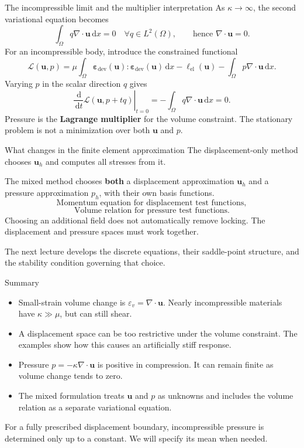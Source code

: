 \documentclass[11pt,aspectratio=169]{beamer}
\newcommand{\bu}{\bm u}
\newcommand{\beps}{\bm\varepsilon}
\newcommand{\Om}{\Omega}
\newcommand{\dd}{\,\mathrm d}
\newcommand{\divg}{\nabla\!\cdot}
\begin{document}
\begin{frame}{The incompressible limit and the multiplier interpretation}
As $\kappa\to\infty$, the second variational equation becomes
\[
\int_\Om q\divg\bu\dd x=0\quad\forall q\in L^2(\Om),
\qquad\text{hence }\divg\bu=0.
\]
For an incompressible body, introduce the constrained functional
\[
\mathcal L(\bu,p)=\mu\int_\Om\beps_{\mathrm{dev}}(\bu):
\beps_{\mathrm{dev}}(\bu)\dd x-\ell_{\mathrm{el}}(\bu)
-\int_\Om p\divg\bu\dd x.
\]
Varying $p$ in the scalar direction $q$ gives
\[
\left.\frac{\dd}{\dd t}\mathcal L(\bu,p+tq)\right|_{t=0}
=-\int_\Om q\divg\bu\dd x=0.
\]
Pressure is the \textbf{Lagrange multiplier} for the volume constraint.
The stationary problem is not a minimization over both $\bu$ and $p$.
\end{frame}

\begin{frame}{What changes in the finite element approximation}
The displacement-only method chooses $\bu_h$ and computes all stresses from it.

The mixed method chooses \textbf{both} a displacement approximation $\bu_h$
and a pressure approximation $p_h$, with their own basis functions.
\[
\text{Momentum equation for displacement test functions},
\]
\[
\text{Volume relation for pressure test functions}.
\]
Choosing an additional field does not automatically remove locking.
The displacement and pressure spaces must work together.

The next lecture develops the discrete equations, their saddle-point
structure, and the stability condition governing that choice.
\end{frame}

\begin{frame}{Summary}
\begin{itemize}
\item Small-strain volume change is $\varepsilon_v=\divg\bu$.
Nearly incompressible materials have $\kappa\gg\mu$, but can still shear.
\item A displacement space can be too restrictive under the volume
constraint. The examples show how this causes an artificially stiff response.
\item Pressure $p=-\kappa\divg\bu$ is positive in compression.
It can remain finite as volume change tends to zero.
\item The mixed formulation treats $\bu$ and $p$ as unknowns and includes
the volume relation as a separate variational equation.
\end{itemize}
For a fully prescribed displacement boundary, incompressible pressure is
determined only up to a constant. We will specify its mean when needed.
\end{frame}
\end{document}
